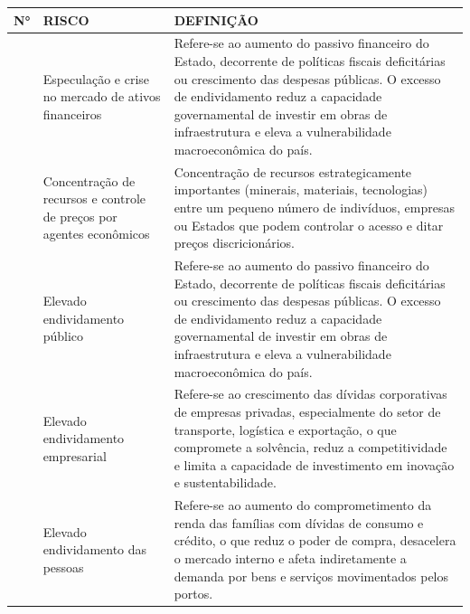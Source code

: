 \documentclass[
  portuguese,
  letterpaper,
  DIV=11,
  numbers=noendperiod]{scrreprt}
\begin{document}
\begin{longtable}[]{@{}
  >{\raggedright\arraybackslash}p{}
  >{\raggedright\arraybackslash}p{}
  >{\raggedright\arraybackslash}p{}@{}}
\toprule\noalign{}
\begin{minipage}[b]{\linewidth}\raggedright
N°
\end{minipage} & \begin{minipage}[b]{\linewidth}\raggedright
RISCO
\end{minipage} & \begin{minipage}[b]{\linewidth}\raggedright
DEFINIÇÃO
\end{minipage} \\
\midrule\noalign{}
\endhead
\bottomrule\noalign{}
\endlastfoot
1 & Especulação e crise no mercado de ativos financeiros & Refere-se ao
aumento do passivo financeiro do Estado, decorrente de políticas fiscais
deficitárias ou crescimento das despesas públicas. O excesso de
endividamento reduz a capacidade governamental de investir em obras de
infraestrutura e eleva a vulnerabilidade macroeconômica do país. \\
2 & Concentração de recursos e controle de preços por agentes econômicos
& Concentração de recursos estrategicamente importantes (minerais,
materiais, tecnologias) entre um pequeno número de indivíduos, empresas
ou Estados que podem controlar o acesso e ditar preços
discricionários. \\
3 & Elevado endividamento público & Refere-se ao aumento do passivo
financeiro do Estado, decorrente de políticas fiscais deficitárias ou
crescimento das despesas públicas. O excesso de endividamento reduz a
capacidade governamental de investir em obras de infraestrutura e eleva
a vulnerabilidade macroeconômica do país. \\
4 & Elevado endividamento empresarial & Refere-se ao crescimento das
dívidas corporativas de empresas privadas, especialmente do setor de
transporte, logística e exportação, o que compromete a solvência, reduz
a competitividade e limita a capacidade de investimento em inovação e
sustentabilidade. \\
5 & Elevado endividamento das pessoas & Refere-se ao aumento do
comprometimento da renda das famílias com dívidas de consumo e crédito,
o que reduz o poder de compra, desacelera o mercado interno e afeta
indiretamente a demanda por bens e serviços movimentados pelos
portos. \\

\end{longtable}
\end{document}
